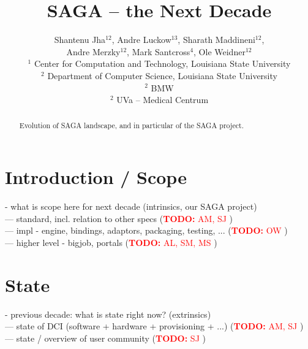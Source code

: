 \documentclass{article}
\newcommand{\B}[1]{\textbf{#1}}
\newcommand{\nind}{\noindent}
\newcommand{\todo}[1]{{\textcolor{red}{\B{TODO:} #1 }}}
\begin{document}
\title{\large SAGA -- the Next Decade}

\author{
        Shantenu Jha$^{12}$,
        Andre Luckow$^{13}$,
        Sharath Maddineni$^{12}$,\\
        Andre Merzky$^{12}$,
        Mark Santcross$^{4}$,
        Ole Weidner$^{12}$
        \\[1em]
        $^1$ \small
          Center for Computation and Technology, 
          Louisiana State University\\[-0.3em]
        $^2$ \small
          Department of Computer Science, 
          Louisiana State University\\[-0.3em]
        $^2$ \small
          BMW\\[-0.3em]
        $^2$ \small
          UVa -- Medical Centrum\\[-0.3em]
       }

\maketitle

\begin{abstract}
 Evolution of SAGA landscape, and in particular of the SAGA project.
\end{abstract}

\section{Introduction / Scope}

  \nind
  - what is scope here for next decade (intrinsics, our SAGA project)\\
  --- standard, incl. relation to other specs (\todo{AM, SJ} )\\
  --- impl - engine, bindings, adaptors, packaging, testing, ... (\todo{OW})\\
  --- higher level - bigjob, portals (\todo{AL, SM, MS})\\
      


\section{State}

    \nind
    - previous decade: what is state right now? (extrinsics)\\
    --- state of DCI (software + hardware + provisioning + ...) (\todo{AM, SJ})\\
    --- state / overview of user community (\todo{SJ})\\
\end{document}
